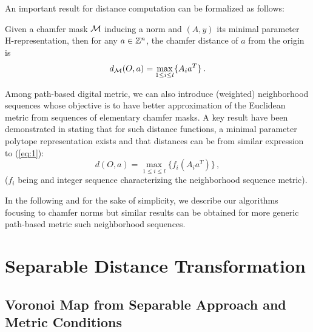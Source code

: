 \documentclass{llncs}
\begin{document}
An important result for distance computation can be formalized as follows:
\begin{proposition}
  Given a chamfer mask $\mathcal{M}$ inducing a norm and $(A,y)$ its minimal
  parameter H-representation, then for any $a\in{\mathbb{Z}}^n$, the chamfer
  distance of $a$ from the origin is
  \begin{equation}
    \label{eq:1}
    d_{\mathcal{M}}(O,a) =  \max_{1\leq i \leq l} \{ A_i a^T\}\,.
  \end{equation}
\end{proposition}


Among path-based digital metric, we can also introduce (weighted)
neighborhood sequences
\cite{ROSEN_66,mukherjee,Nagy05,Strand2008,DBLP:conf/dgci/NormandSE13}
whose objective is to have better approximation of the Euclidean
metric from sequences of elementary chamfer masks.  A key result have
been demonstrated in \cite{DBLP:journals/pr/NormandE09} stating
that for such distance functions, a minimal parameter polytope
representation exists and that distances can be from similar
expression to (\ref{eq:1}):
\begin{equation}
  d(O,a)  =\max_{1\leq i \leq l} \{ f_i(A_i a^T)\}\,,
\end{equation}
($f_i$ being and integer sequence characterizing the neighborhood
sequence metric).


 In the following and for the sake of simplicity, we describe our
 algorithms focusing to chamfer norms but similar results can be
 obtained for more generic path-based metric such neighborhood
 sequences.

\section{Separable Distance Transformation}
\label{sec:separ-dist-transf}



\subsection{Voronoi Map from Separable Approach and Metric Conditions}
\label{sec:voronoi-map-from}
\end{document}
